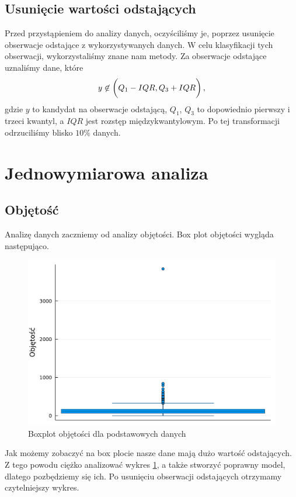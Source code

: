 \documentclass[12pt,leqno]{article}
\theoremstyle{exer}
\begin{document}
	\subsection{Usunięcie wartości odstających}
	Przed przystąpieniem do analizy danych, oczyściliśmy je, poprzez usunięcie obserwacje odstające z wykorzystywanych danych. W celu klasyfikacji tych obserwacji, wykorzystaliśmy znane nam metody. Za obserwacje odstające uznaliśmy dane, które
	\begin{equation}
		y\not\in\left(\vphantom{\frac{1}{1}}Q_1-IQR,Q_3+IQR\right),
	\end{equation}
	gdzie $y$ to kandydat na obserwacje odstającą, $Q_1$, $Q_3$ to dopowiednio pierwszy i trzeci kwantyl, a $IQR$ jest rozstęp międzykwantylowym. Po tej transformacji odrzuciliśmy blisko $10\%$ danych.
	\section{Jednowymiarowa analiza}
	\subsection{Objętość}
	Analizę danych zaczniemy od analizy objętości. Box plot objętości wygląda następująco.
	
	\begin{figure}[H]
		\centering
		\includegraphics[width=4\columnwidth/5]{images/boxplot_V_danych.pdf}
		\caption{Boxplot objętości dla podstawowych danych}
		\label{fig:box_V_orginal}
	\end{figure}
	
	Jak możemy zobaczyć na box plocie nasze dane mają dużo wartość odstających. Z tego powodu ciężko analizować wykres \ref{fig:box_V_orginal}, a także stworzyć poprawny model, dlatego pozbędziemy się ich. Po usunięciu obserwacji odstających otrzymamy czytelniejszy wykres.
	
\end{document}
